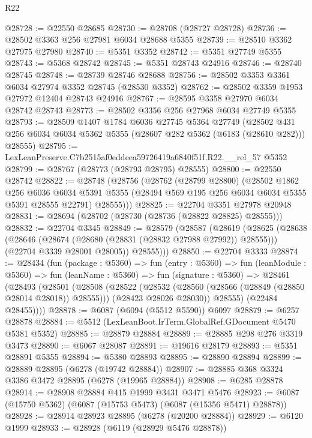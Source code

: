 \begin{lexlean}{R22}
\begin{coremodule}
@28728 := @22550 @28685
@28730 := @28708 (@28727 @28728)
@28736 := @28502 @3363 @256 @27981 @6034 @28688 @5355
@28739 := @28510 @3362 @27975 @27980
@28740 := @5351 @3352
@28742 := @5351 @27749 @5355
@28743 := @5368 @28742
@28745 := @5351 @28743 @24916
@28746 := @28740 @28745
@28748 := @28739 @28746 @28688
@28756 := @28502 @3353 @3361 @6034 @27974 @3352 @28745 (@28530 @3352)
@28762 := @28502 @3359 @1953 @27972 @12404 @28743 @24916
@28767 := @28595 @3358 @27970 @6034 @28742 @28743
@28773 := @28502 @3356 @256 @27968 @6034 @27749 @5355
@28793 := @28509
    @1407
    @1784
    @6036
    @27745
    @5364
    @27749
    (@28502 @431 @256 @6034 @6034 @5362 @5355 (@28607 @282 @5362 (@6183 (@28610 @282))) @28555)
@28795 := LexLeanPreserve.C7b2515af0eddeea59726419a6840f51f.R22.__rel_57 @5352
@28799 := @28767 (@28773 (@28793 @28795) @28555)
@28800 := @22550 @28742
@28822 := @28748
    (@28756
      (@28762
        (@28799 @28800)
        (@28502
          @1862
          @256
          @6036
          @6034
          @5391
          @5355
          (@28494 @569 @195 @256 @6034 @6034 @5355 @5391 @28555 @22791)
          @28555)))
@28825 := @22704 @3351 @27978 @20948
@28831 := @28694 (@28702 (@28730 (@28736 (@28822 @28825) @28555)))
@28832 := @22704 @3345
@28849 := @28579
    (@28587
      (@28619
        (@28625
          (@28638
            (@28646 (@28674 (@28680 (@28831 (@28832 @27988 @27992)) @28555)))
            (@22704 @3339 @28001 @28005))
          @28555)))
@28850 := @22704 @3333
@28874 := @28434
    (fun (package : @5360) =>
    fun (entry : @5360) =>
    fun (leanModule : @5360) =>
    fun (leanName : @5360) =>
    fun (signature : @5360) =>
    @28461
      (@28493
        (@28501
          (@28508
            (@28522
              (@28532 (@28560 (@28566 (@28849 (@28850 @28014 @28018)) @28555)))
              (@28423 @28026 @28030))
            @28555)
          (@22484 @28455))))
@28878 := @6087 (@6094 (@5512 @5590)) @6097
@28879 := @6257 @28878
@28884 := @5512 (LexLeanBoot.IrTerm.GlobalRef.GDocument @5470 @5381 @5352)
@28885 := @28879 @28884
@28889 := @28885 @298 @276 @3319 @3473
@28890 := @6067 @28087
@28891 := @19616 @28179
@28893 := @5351 @28891 @5355
@28894 := @5380 @28893
@28895 := @28890 @28894
@28899 := @28889 @28895 (@6278 (@19742 @28884))
@28907 := @28885 @368 @3324 @3386 @3472 @28895 (@6278 (@19965 @28884))
@28908 := @6285 @28878
@28914 := @28908 @28884 @415 @1999 @3431 @3471 @5476
@28923 := @6087 (@15750 @5362) (@6087 (@15753 @5473) (@6087 (@15356 @5471) @28878))
@28928 := @28914 @28923 @28895 (@6278 (@20200 @28884))
@28929 := @6120 @1999
@28933 := @28928 (@6119 (@28929 @5476 @28878))

\end{coremodule}
\end{lexlean}
